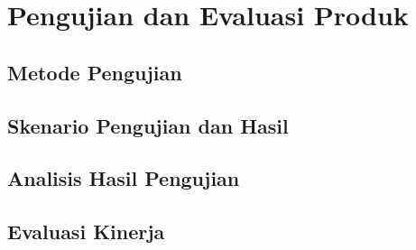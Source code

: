 \chapter{Pengujian dan Evaluasi Produk}

\section{Metode Pengujian}

\section{Skenario Pengujian dan Hasil}

\section{Analisis Hasil Pengujian}

\section{Evaluasi Kinerja}
